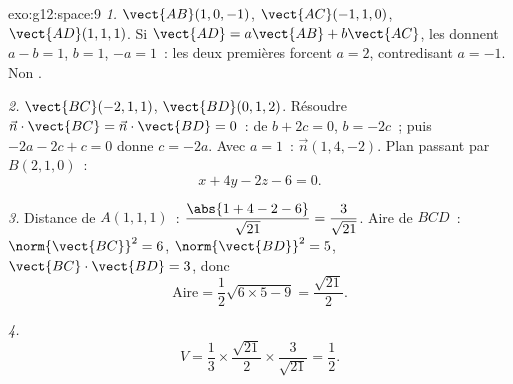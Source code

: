 \begin{solution}{exo:g12:space:9}
\emph{1.} $\vect{AB}(1, 0, -1)$, $\vect{AC}(-1, 1, 0)$,
$\vect{AD}(1, 1, 1)$. Si $\vect{AD} = a\vect{AB} + b\vect{AC}$, les
 donnent $a - b = 1$, $b = 1$, $-a = 1$~: les deux premières
forcent $a = 2$, contredisant $a = -1$. Non .

\emph{2.} $\vect{BC}(-2, 1, 1)$, $\vect{BD}(0, 1, 2)$. Résoudre
$\vec n \cdot \vect{BC} = \vec n \cdot \vect{BD} = 0$~: de
$b + 2c = 0$, $b = -2c$~; puis $-2a - 2c + c = 0$ donne $c = -2a$. Avec
$a = 1$~: $\vec n(1, 4, -2)$. Plan passant par $B(2,1,0)$~:
\[
x + 4y - 2z - 6 = 0 .
\]

\emph{3.} Distance de $A(1,1,1)$~:
$\dfrac{\abs{1 + 4 - 2 - 6}}{\sqrt{21}} = \dfrac{3}{\sqrt{21}}$.
Aire de $BCD$~: $\norm{\vect{BC}}^2 = 6$, $\norm{\vect{BD}}^2 = 5$,
$\vect{BC}\cdot\vect{BD} = 3$, donc
\[
\text{Aire} = \frac12\sqrt{6 \times 5 - 9} = \frac{\sqrt{21}}{2}.
\]

\emph{4.}
\[
V = \frac13 \times \frac{\sqrt{21}}{2} \times \frac{3}{\sqrt{21}}
= \frac12 .
\]
\end{solution}

